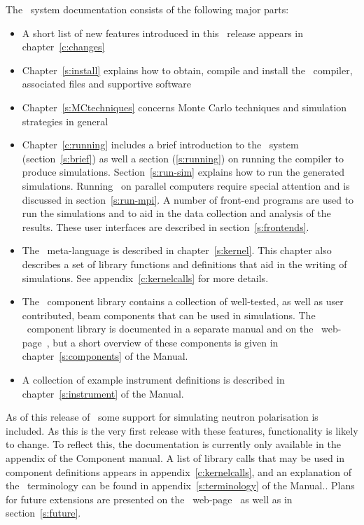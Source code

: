 The \MCX\ system documentation consists of the following major
parts:
\begin{itemize}
\item A short list of new features introduced in this \MCX\ release
  appears in chapter~\ref{c:changes}
\item Chapter~\ref{s:install} explains how to obtain, compile
  and install the \MCX\ compiler, associated files and supportive software
\item Chapter~\ref{s:MCtechniques} concerns Monte Carlo techniques
  and simulation strategies in general
\item Chapter~\ref{c:running} includes a brief introduction to the
  \MCX\ system
  (section~\ref{s:brief}) as well a section (\ref{s:running}) on running the compiler to produce
  simulations. Section~\ref{s:run-sim} explains how to run the generated
  simulations. Running \MCX\ on parallel computers require special
  attention and is discussed in section~\ref{s:run-mpi}. A number of front-end programs are used to run the
  simulations and to aid in the data collection and analysis of the
  results. These user interfaces are described in section~\ref{s:frontends}.
\item The \MCX\ meta-language is described in chapter~\ref{s:kernel}. This
  chapter also describes a set of library functions and definitions
  that aid in the writing of simulations. See
  appendix~\ref{c:kernelcalls} for more details.
\item The \MCX\ component library contains a collection of
  well-tested, as well as user contributed, beam components that can be used in simulations.
  The \MCX\ component library is documented in a separate manual
  and on the \MCX\ web-page~\cite{mcstas_webpage}, but a short overview of these
  components is given in chapter~\ref{s:components} of the Manual.
\item A collection of example instrument definitions is described in
  chapter~\ref{s:instrument} of the Manual.%

\end{itemize}

As of this release of \MCX\, some support for simulating neutron
polarisation is included. As this is the very first release with these
features, functionality is likely to change. To reflect this, the
documentation is currently only available in the appendix of the Component manual. %
A list of library calls that may be used in component definitions
appears in appendix~\ref{c:kernelcalls}, and
an explanation of the \MCX\ terminology can be
found in appendix~\ref{s:terminology} of the Manual..
Plans for future extensions are presented on the \MCX\ web-page~\cite{mcstas_webpage} as well as in section~\ref{s:future}.


